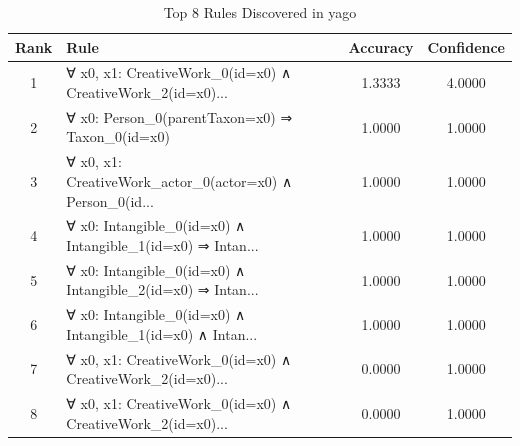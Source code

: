 \documentclass[11pt,a4paper]{article}
\begin{document}
\begin{table}[h!]
\centering
\small
\caption{Top 8 Rules Discovered in yago}
\label{tab:rules_yago}
\begin{tabular}{|c|p{5cm}|c|c|}
\hline
\textbf{Rank} & \textbf{Rule} & \textbf{Accuracy} & \textbf{Confidence} \\
\hline
1 & ∀ x0, x1: CreativeWork\_0(id=x0) ∧ CreativeWork\_2(id=x0)... & 1.3333 & 4.0000 \\
2 & ∀ x0: Person\_0(parentTaxon=x0) ⇒ Taxon\_0(id=x0) & 1.0000 & 1.0000 \\
3 & ∀ x0, x1: CreativeWork\_actor\_0(actor=x0) ∧ Person\_0(id... & 1.0000 & 1.0000 \\
4 & ∀ x0: Intangible\_0(id=x0) ∧ Intangible\_1(id=x0) ⇒ Intan... & 1.0000 & 1.0000 \\
5 & ∀ x0: Intangible\_0(id=x0) ∧ Intangible\_2(id=x0) ⇒ Intan... & 1.0000 & 1.0000 \\
6 & ∀ x0: Intangible\_0(id=x0) ∧ Intangible\_1(id=x0) ∧ Intan... & 1.0000 & 1.0000 \\
7 & ∀ x0, x1: CreativeWork\_0(id=x0) ∧ CreativeWork\_2(id=x0)... & 0.0000 & 1.0000 \\
8 & ∀ x0, x1: CreativeWork\_0(id=x0) ∧ CreativeWork\_2(id=x0)... & 0.0000 & 1.0000 \\
\hline
\end{tabular}
\end{table}
\end{document}
